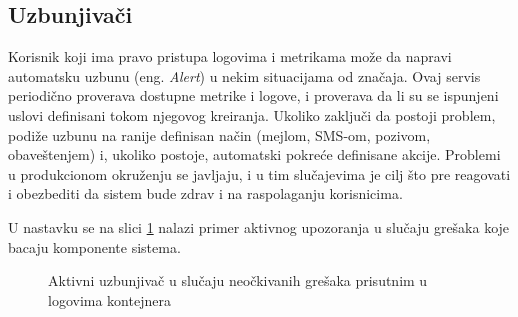 \documentclass[12pt,oneside]{memoir}
\begin{document}
\subsection{Uzbunjivači}

Korisnik koji ima pravo pristupa logovima i metrikama može da napravi automatsku uzbunu (eng. \emph{Alert}) u nekim situacijama od značaja. Ovaj servis periodično proverava dostupne metrike i logove, i proverava da li su se ispunjeni uslovi definisani tokom njegovog kreiranja. Ukoliko zaključi da postoji problem, podiže uzbunu na ranije definisan način (mejlom, SMS-om, pozivom, obaveštenjem) i, ukoliko postoje, automatski pokreće definisane akcije. Problemi u produkcionom okruženju se javljaju, i u tim slučajevima je cilj što pre reagovati i obezbediti da sistem bude zdrav i na raspolaganju korisnicima.

U nastavku se na slici \ref{fig:alertex} nalazi primer aktivnog upozoranja u slučaju grešaka koje bacaju komponente sistema.

\begin{figure}[!ht]
  \centering
  \caption{Aktivni uzbunjivač u slučaju neočkivanih grešaka prisutnim u logovima kontejnera}
  \label{fig:alertex}
\end{figure}
\end{document}
